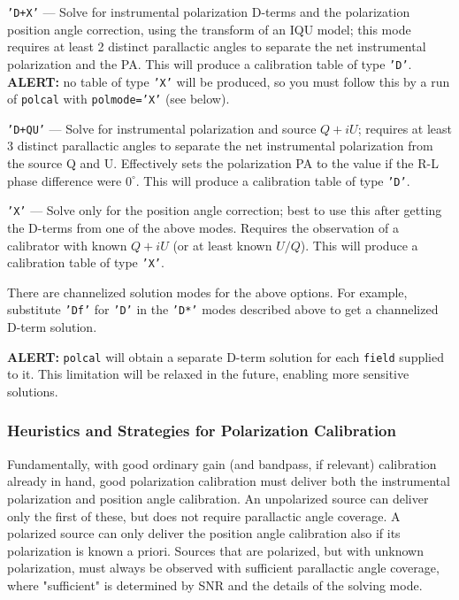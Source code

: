 {\begin{description}
\item{\tt 'D+X'} --- Solve for instrumental polarization D-terms and
the polarization position angle correction, using the transform of an
IQU model; this mode requires at least 2 distinct
parallactic angles to separate the net instrumental polarization and
the PA. This will produce a calibration table of
type {\tt 'D'}. {\bf ALERT:} no table of type {\tt 'X'} will be
produced, so you must follow this by a run of {\tt polcal} with
{\tt polmode='X'} (see below).

\item{\tt 'D+QU'} --- Solve for instrumental polarization and source 
$Q+iU$; requires at least 3 distinct parallactic angles to separate
the net instrumental polarization from the source Q and U.
Effectively sets the polarization PA to the value if the R-L phase
difference were $0^\circ$.  This will produce a calibration table of
type {\tt 'D'}. 

\item{\tt 'X'} --- Solve only for the position angle correction; best to use
this after getting the D-terms from one of the above modes.  Requires
the observation of a calibrator with known $Q+iU$ (or at least known $U/Q$).
This will produce a calibration table of type {\tt 'X'}. 

\end{description}

There are channelized solution modes for the above options.  For
example, substitute {\tt 'Df'} for {\tt 'D'} in the {\tt 'D*'} modes 
described above to get a channelized D-term solution.  

{\bf ALERT:} {\tt polcal} will obtain a separate D-term solution for
each {\tt field} supplied to it.  This limitation will be relaxed in 
the future, enabling more sensitive solutions.


\subsubsection{Heuristics and Strategies for Polarization Calibration }
\label{section:cal.solve.pol.hstics}

Fundamentally, with good ordinary gain (and bandpass, if relevant)
calibration already in hand, good polarization calibration must
deliver both the instrumental polarization and position angle
calibration.  An unpolarized source can deliver only the first of
these, but does not require parallactic angle coverage.  A polarized
source can only deliver the position angle calibration also if its
polarization is known a priori.  Sources that are polarized, but with
unknown polarization, must always be observed with sufficient
parallactic angle coverage, where "sufficient" is determined by SNR
and the details of the solving mode.

}
